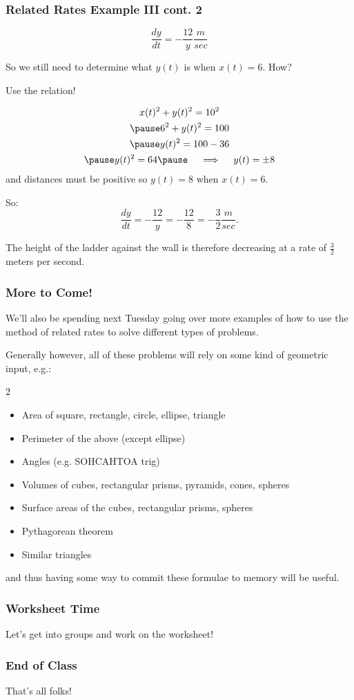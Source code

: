 \documentclass{ltx-talk}
\begin{document}
\begin{frame}
  \frametitle{Related Rates Example III cont. 2}
  \begin{equation}
    \dfrac{dy}{dt} = - \dfrac{12}{y} \dfrac{m}{sec}
  \end{equation}

  So we still need to determine what $y(t)$ is when $x(t) = 6$. How? \pause

  Use the relation! \pause

  \begin{gather}
    x(t)^2 + y(t)^2 = 10^2 \\  \pause
    6^2 + y(t)^2 = 100 \\ \pause
    y(t)^2 = 100 - 36 \\ \pause
    y(t)^2 = 64 \pause \quad \implies \quad y(t) = \pm 8
  \end{gather}
  and distances must be positive so $y(t) = 8$ when $x(t) = 6$. \pause

  So:
  \begin{equation}
    \dfrac{dy}{dt} = - \dfrac{12}{y} = -\dfrac{12}{8} = -\dfrac{3}{2} \dfrac{m}{sec}.
  \end{equation} \pause

  The height of the ladder against the wall is therefore decreasing at a rate of $\frac{3}{2}$ meters per second.
\end{frame}

\begin{frame}
  \frametitle{More to Come!}

  We'll also be spending next Tuesday going over more examples of how to use 
  the method of related rates to solve different types of problems. \pause

  Generally however, all of these problems will rely on some kind of geometric input, 
  e.g.: \pause

  \begin{multicols}{2}
    \begin{itemize}
      \item Area of square, rectangle, circle, ellipse, triangle
      \item Perimeter of the above (except ellipse)
      \item Angles (e.g. SOHCAHTOA trig) 
      \item Volumes of cubes, rectangular prisms, pyramids, cones, spheres
      \item Surface areas of the cubes, rectangular prisms, spheres
      \item Pythagorean theorem
      \item Similar triangles
    \end{itemize}
  \end{multicols}

  and thus having some way to commit these formulae to memory will be useful.
\end{frame}

\begin{frame}
  \frametitle{Worksheet Time}

  Let's get into groups and work on the worksheet!
\end{frame}

\begin{frame}
  \frametitle{End of Class}

  That's all folks!
\end{frame}
\end{document}
